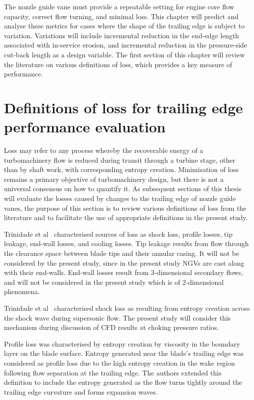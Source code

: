 \documentclass[a4paper, 11pt, oneside]{report}
\begin{document}
The nozzle guide vane must provide a repeatable setting for engine core flow capacity, correct flow turning, and minimal loss. This chapter will predict and analyse these metrics for cases where the shape of the trailing edge is subject to variation. Variations will include incremental reduction in the end-edge length associated with in-service erosion, and incremental reduction in the pressure-side cut-back length as a design variable. The first section of this chapter will review the literature on various definitions of loss, which provides a key measure of performance.


\section{Definitions of loss for trailing edge performance evaluation}
\label{definitions_of_loss}

Loss may refer to any process whereby the recoverable energy of a turbomachinery flow is reduced during transit through a turbine stage, other than by shaft work, with corresponding entropy creation. Minimisation of loss remains a primary objective of turbomachinery design, but there is not a universal consensus on how to quantify it. As subsequent sections of this thesis will evaluate the losses caused by changes to the trailing edge of nozzle guide vanes, the purpose of this section is to review various definitions of loss from the literature and to facilitate the use of appropriate definitions in the present study.

Trinidade et al~\cite{trinidade_loss} characterised sources of loss as shock loss, profile losses, tip leakage, end-wall losses, and cooling losses. Tip leakage results from flow through the clearance space between blade tips and their annular casing. It will not be considered by the present study, since in the present study NGVs are cast along with their end-walls. End-wall losses result from 3-dimensional secondary flows, and will not be considered in the present study which is of 2-dimensional phenomena.

Trinidade et al~\cite{trinidade_loss} characterised shock loss as resulting from entropy creation across the shock wave during supersonic flow. The present study will consider this mechanism during discussion of CFD results at choking pressure ratios.

Profile loss was characterised by entropy creation by viscosity in the boundary layer on the blade surface. Entropy generated near the blade's trailing edge was considered as profile loss due to the high entropy creation in the wake region following flow separation at the trailing edge. The authors extended this definition to include the entropy generated as the flow turns tightly around the trailing edge curvature and forms expansion waves.
\end{document}
